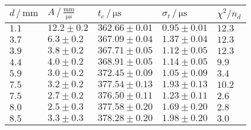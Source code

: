 	\begin{tabular}{|p{2cm}|p{3cm}|p{3cm}|p{3cm}|p{2cm}|}
		\hline
		\rowcolor{tabcolor}
		$d \, / \, \mathrm{mm}$        & $A \, / \, \mathrm{\frac{mm}{\mu s}}$ & 
     			$t_c \, / \, \mathrm{\mu s}$    & $\sigma_t \, / \, \mathrm{\mu s}$ & 
     			$\chi^2 / n_d$ \\ \hline
		$1.1$ & $12.2 \pm 0.2$ & $362.66 \pm 0.01$ & $0.95 \pm 0.01$ & $12.3$\\ 
		$3.7$ & $6.3 \pm 0.2$ & $367.09 \pm 0.04$ & $1.37 \pm 0.04$ & $12.3$\\ 
		$3.9$ & $3.8 \pm 0.2$ & $367.71 \pm 0.05$ & $1.12 \pm 0.05$ & $12.3$\\ 
		$4.4$ & $4.0 \pm 0.2$ & $368.91 \pm 0.05$ & $1.14 \pm 0.05$ & $9.9$\\ 
		$5.9$ & $3.0 \pm 0.2$ & $372.45 \pm 0.09$ & $1.05 \pm 0.09$ & $3.4$\\ 
		$7.5$ & $3.2 \pm 0.2$ & $377.54 \pm 0.13$ & $1.93 \pm 0.13$ & $10.2$\\ 
		$7.5$ & $2.7 \pm 0.2$ & $376.50 \pm 0.11$ & $1.23 \pm 0.11$ & $2.6$\\ 
		$8.0$ & $2.5 \pm 0.3$ & $377.58 \pm 0.20$ & $1.69 \pm 0.20$ & $2.8$\\ 
		$8.5$ & $3.3 \pm 0.3$ & $378.28 \pm 0.20$ & $1.98 \pm 0.20$ & $3.0$\\ 
		\hline
	\end{tabular}
